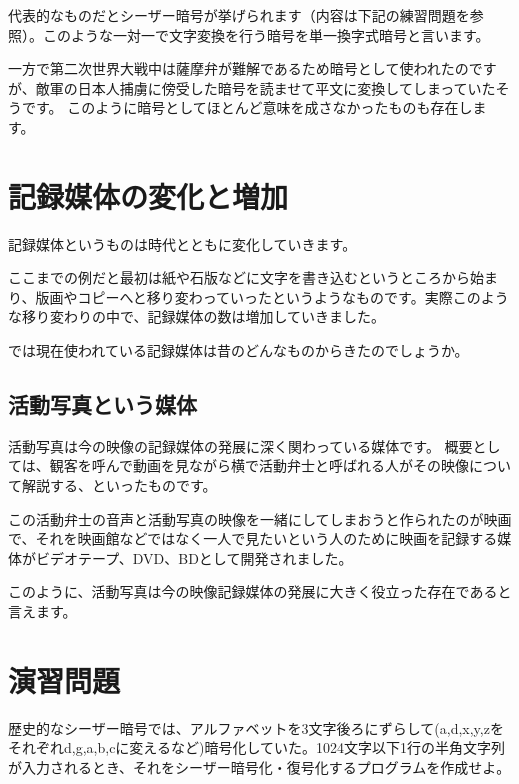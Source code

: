 代表的なものだとシーザー暗号が挙げられます（内容は下記の練習問題を参照）。このような一対一で文字変換を行う暗号を単一換字式暗号と言います。

一方で第二次世界大戦中は薩摩弁が難解であるため暗号として使われたのですが、敵軍の日本人捕虜に傍受した暗号を読ませて平文に変換してしまっていたそうです。
このように暗号としてほとんど意味を成さなかったものも存在します。


\section{記録媒体の変化と増加}

記録媒体というものは時代とともに変化していきます。

ここまでの例だと最初は紙や石版などに文字を書き込むというところから始まり、版画やコピーへと移り変わっていったというようなものです。実際このような移り変わりの中で、記録媒体の数は増加していきました。

では現在使われている記録媒体は昔のどんなものからきたのでしょうか。

\subsection{活動写真という媒体}

活動写真は今の映像の記録媒体の発展に深く関わっている媒体です。
概要としては、観客を呼んで動画を見ながら横で活動弁士と呼ばれる人がその映像について解説する、といったものです。

この活動弁士の音声と活動写真の映像を一緒にしてしまおうと作られたのが映画で、それを映画館などではなく一人で見たいという人のために映画を記録する媒体がビデオテープ、DVD、BDとして開発されました。

このように、活動写真は今の映像記録媒体の発展に大きく役立った存在であると言えます。

\section*{演習問題}
\begin{problems}
\item 歴史的なシーザー暗号では、アルファベットを3文字後ろにずらして(a,d,x,y,zをそれぞれd,g,a,b,cに変えるなど)暗号化していた。1024文字以下1行の半角文字列が入力されるとき、それをシーザー暗号化・復号化するプログラムを作成せよ。
\end{problems}

